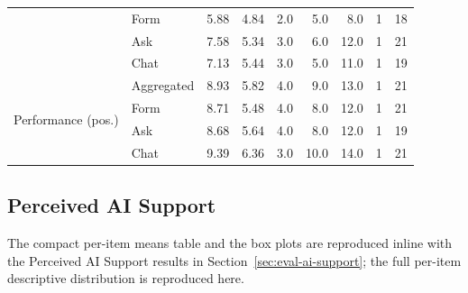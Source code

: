 \begin{table}[htbp]
\begin{tabular}{@{}l l r r r r r r r@{}}
                                   & Form & 5.88 & 4.84 & 2.0 & 5.0  & 8.0  & 1 & 18 \\
                                   & Ask  & 7.58 & 5.34 & 3.0 & 6.0  & 12.0 & 1 & 21 \\
                                   & Chat & 7.13 & 5.44 & 3.0 & 5.0  & 11.0 & 1 & 19 \\
\midrule
\multirow{4}{*}{Performance (pos.)} & Aggregated  & 8.93 & 5.82 & 4.0 & 9.0  & 13.0 & 1 & 21 \\
                                    & Form & 8.71 & 5.48 & 4.0 & 8.0  & 12.0 & 1 & 21 \\
                                    & Ask  & 8.68 & 5.64 & 4.0 & 8.0  & 12.0 & 1 & 19 \\
                                    & Chat & 9.39 & 6.36 & 3.0 & 10.0 & 14.0 & 1 & 21 \\
\bottomrule
\end{tabular}
\end{table}

\subsection{Perceived AI Support}
\label{app:items-ai}

The compact per-item means table and the box plots are reproduced
inline with the Perceived AI Support results in
Section~\ref{sec:eval-ai-support}; the full per-item descriptive
distribution is reproduced here.

